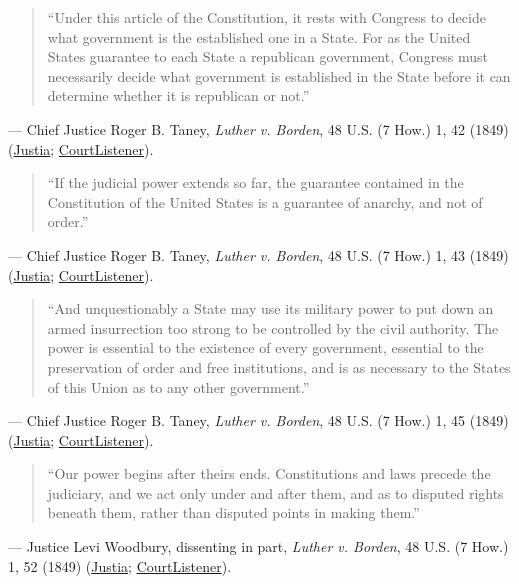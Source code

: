 \documentclass[12pt]{article}
\begin{document}
\begin{quote}
``Under this article of the Constitution, it rests with Congress to decide what government is the established one in a State. For as the United States guarantee to each State a republican government, Congress must necessarily decide what government is established in the State before it can determine whether it is republican or not.''
\end{quote}
\noindent --- Chief Justice Roger B. Taney, \textit{Luther v. Borden}, 48 U.S. (7 How.) 1, 42 (1849) (\href{https://supreme.justia.com/cases/federal/us/48/1/}{Justia}; \href{https://www.courtlistener.com/opinion/86466/luther-v-borden/}{CourtListener}).

\begin{quote}
``If the judicial power extends so far, the guarantee contained in the Constitution of the United States is a guarantee of anarchy, and not of order.''
\end{quote}
\noindent --- Chief Justice Roger B. Taney, \textit{Luther v. Borden}, 48 U.S. (7 How.) 1, 43 (1849) (\href{https://supreme.justia.com/cases/federal/us/48/1/}{Justia}; \href{https://www.courtlistener.com/opinion/86466/luther-v-borden/}{CourtListener}).

\begin{quote}
``And unquestionably a State may use its military power to put down an armed insurrection too strong to be controlled by the civil authority. The power is essential to the existence of every government, essential to the preservation of order and free institutions, and is as necessary to the States of this Union as to any other government.''
\end{quote}
\noindent --- Chief Justice Roger B. Taney, \textit{Luther v. Borden}, 48 U.S. (7 How.) 1, 45 (1849) (\href{https://supreme.justia.com/cases/federal/us/48/1/}{Justia}; \href{https://www.courtlistener.com/opinion/86466/luther-v-borden/}{CourtListener}).

\begin{quote}
``Our power begins after theirs ends. Constitutions and laws precede the judiciary, and we act only under and after them, and as to disputed rights beneath them, rather than disputed points in making them.''
\end{quote}
\noindent --- Justice Levi Woodbury, dissenting in part, \textit{Luther v. Borden}, 48 U.S. (7 How.) 1, 52 (1849) (\href{https://supreme.justia.com/cases/federal/us/48/1/}{Justia}; \href{https://www.courtlistener.com/opinion/86466/luther-v-borden/}{CourtListener}).
\end{document}
